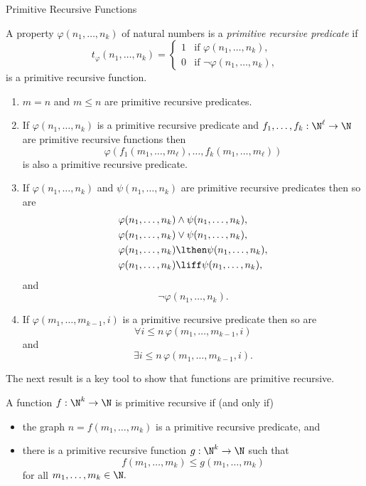 \begin{unit}{Primitive Recursive Functions}
\begin{definition}\label{D:PrimitiveRecursivePredicate}
  A property \(\varphi(n_1,\dots,n_k)\) of natural numbers is a \emph{primitive recursive predicate} if \[t_\varphi(n_1,\dots,n_k) = \begin{cases} 1 & \text{if $\varphi(n_1,\dots,n_k)$,} \\ 0 & \text{if $\lnot\varphi(n_1,\dots,n_k)$,} \end{cases}\] is a primitive recursive function.
\end{definition}

\begin{theorem}\label{T:PrimitiveRecursivePredicate}\mbox{}
\begin{enumerate}[\upshape(a)]
\item \(m = n\) and \(m \leq n\) are primitive recursive predicates.
\item If \(\varphi(n_1,\dots,n_k)\) is a primitive recursive predicate and \(f_1,\dots,f_k:\N^\ell\to\N\) are primitive recursive functions then \[\varphi(f_1(m_1,\dots,m_\ell),\dots,f_k(m_1,\dots,m_\ell))\] is also a primitive recursive predicate.
\item If \(\varphi(n_1,\dots,n_k)\) and \(\psi(n_1,\dots,n_k)\) are primitive recursive predicates then so are \[\begin{aligned}
    \varphi(n_1,\dots,n_k) &\land \psi(n_1,\dots,n_k), \\
    \varphi(n_1,\dots,n_k) &\lor \psi(n_1,\dots,n_k), \\
    \varphi(n_1,\dots,n_k) &\lthen \psi(n_1,\dots,n_k), \\
    \varphi(n_1,\dots,n_k) &\liff \psi(n_1,\dots,n_k), \\
  \end{aligned}\] and \[\lnot\varphi(n_1,\dots,n_k).\]
\item
  If \(\varphi(m_1,\dots,m_{k-1},i)\) is a primitive recursive predicate then so are 
  \[\forall i \leq n\,\varphi(m_1,\dots,m_{k-1},i)\] and
  \[\exists i \leq n\,\varphi(m_1,\dots,m_{k-1},i).\] 
\end{enumerate}
\end{theorem}

\noindent
The next result is a key tool to show that functions are primitive recursive.

\begin{theorem}\label{T:PrimitiveRecursiveDescription}
  A function \(f:\N^k\to\N\) is primitive recursive if \textup(and only if\textup)
  \begin{itemize}
  \item the graph \(n = f(m_1,\dots,m_k)\) is a primitive recursive predicate, and
  \item there is a primitive recursive function \(g:\N^k\to\N\) such that \[f(m_1,\dots,m_k) \leq g(m_1,\dots,m_k)\] for all \(m_1,\dots,m_k \in \N.\)
  \end{itemize}
\end{theorem}


\end{unit}
